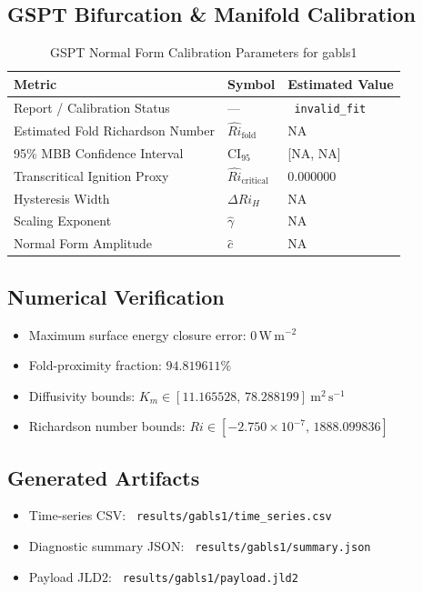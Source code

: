 \subsection{GSPT Bifurcation \& Manifold Calibration}
\begin{table}[htbp]
\centering
\caption{GSPT Normal Form Calibration Parameters for gabls1}
\label{tab:gspt_calibration_gabls1_gabls1_200x2m_12h_report}
\begin{tabular}{lll}
\hline
{\bfseries Metric} & {\bfseries Symbol} & {\bfseries Estimated Value} \\
\hline
Report / Calibration Status & --- & \texttt{ invalid\_fit } \\
Estimated Fold Richardson Number & $\hat{Ri}_{\mathrm{fold}}$ & NA \\
95\% MBB Confidence Interval & CI$_{95}$ & [NA, NA] \\
Transcritical Ignition Proxy & $\hat{Ri}_{\mathrm{critical}}$ & 0.000000 \\
Hysteresis Width & $\Delta Ri_H$ & NA \\
Scaling Exponent & $\hat{\gamma}$ & NA \\
Normal Form Amplitude & $\hat{c}$ & NA \\
\hline
\end{tabular}
\end{table}

\subsection{Numerical Verification}
\begin{itemize}
  \item Maximum surface energy closure error:
  $0\,\mathrm{W\,m^{-2}}$
  \item Fold-proximity fraction:
  $94.819611\%$
  \item Diffusivity bounds:
  $K_m \in [11.165528,\,78.288199]~\mathrm{m^2\,s^{-1}}$
  \item Richardson number bounds:
  $Ri \in [-2.750 \times 10^{-7},\,1888.099836]$
\end{itemize}

\subsection{Generated Artifacts}
\begin{itemize}
  \item Time-series CSV: \texttt{ results/gabls1/time\_series.csv }
  \item Diagnostic summary JSON: \texttt{ results/gabls1/summary.json }
  \item Payload JLD2: \texttt{ results/gabls1/payload.jld2 }
\end{itemize}

